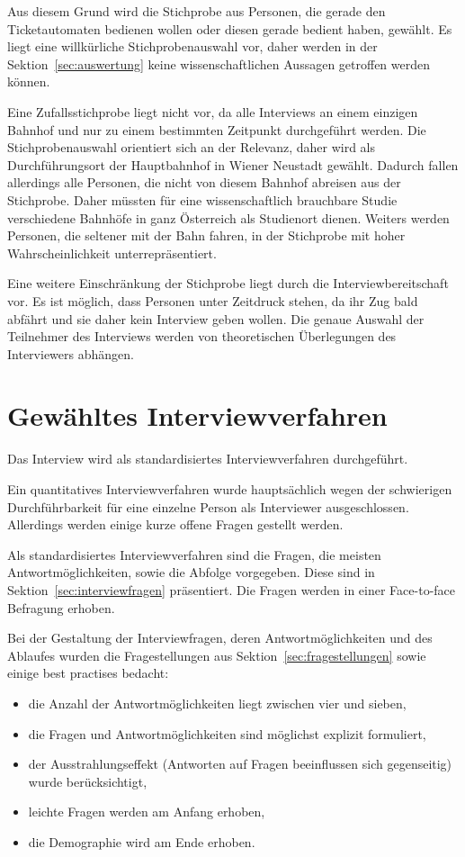 \documentclass[]{article}
\begin{document}
Aus diesem Grund wird die Stichprobe aus Personen, die gerade den Ticketautomaten bedienen wollen oder diesen gerade bedient haben, gewählt. Es liegt eine willkürliche Stichprobenauswahl vor, daher werden in der Sektion~\ref{sec:auswertung} keine wissenschaftlichen Aussagen getroffen werden können.

Eine Zufallsstichprobe liegt nicht vor, da alle Interviews an einem einzigen Bahnhof und nur zu einem bestimmten Zeitpunkt durchgeführt werden. Die Stichprobenauswahl orientiert sich an der Relevanz, daher wird als Durchführungsort der Hauptbahnhof in Wiener Neustadt gewählt. Dadurch fallen allerdings alle Personen, die nicht von diesem Bahnhof abreisen aus der Stichprobe. Daher müssten für eine wissenschaftlich brauchbare Studie verschiedene Bahnhöfe in ganz Österreich als Studienort dienen. Weiters werden Personen, die seltener mit der Bahn fahren, in der Stichprobe mit hoher Wahrscheinlichkeit unterrepräsentiert.

Eine weitere Einschränkung der Stichprobe liegt durch die Interviewbereitschaft vor. Es ist möglich, dass Personen unter Zeitdruck stehen, da ihr Zug bald abfährt und sie daher kein Interview geben wollen. Die genaue Auswahl der Teilnehmer des Interviews werden von theoretischen Überlegungen des Interviewers abhängen.

\section{Gewähltes Interviewverfahren}
Das Interview wird als standardisiertes Interviewverfahren durchgeführt.

Ein quantitatives Interviewverfahren wurde hauptsächlich wegen der schwierigen Durchführbarkeit für eine einzelne Person als Interviewer ausgeschlossen. Allerdings werden einige kurze offene Fragen gestellt werden.

Als standardisiertes Interviewverfahren sind die Fragen, die meisten Antwortmöglichkeiten, sowie die Abfolge vorgegeben. Diese sind in Sektion~\ref{sec:interviewfragen} präsentiert. Die Fragen werden in einer Face-to-face Befragung erhoben.

Bei der Gestaltung der Interviewfragen, deren Antwortmöglichkeiten und des Ablaufes wurden die Fragestellungen aus Sektion~\ref{sec:fragestellungen} sowie einige best practises bedacht:
\begin{itemize}
	\item die Anzahl der Antwortmöglichkeiten liegt zwischen vier und sieben,
	\item die Fragen und Antwortmöglichkeiten sind möglichst explizit formuliert,
	\item der Ausstrahlungseffekt (Antworten auf Fragen beeinflussen sich gegenseitig) wurde berücksichtigt,
	\item leichte Fragen werden am Anfang erhoben,
	\item die Demographie wird am Ende erhoben.
\end{itemize}
\end{document}
